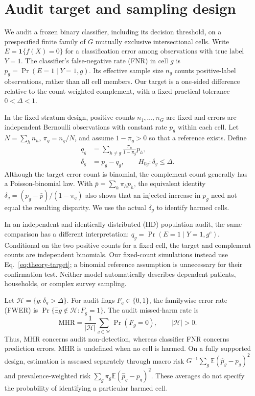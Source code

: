 \section{Audit target and sampling design}\label{sec:audit-target}

We audit a frozen binary classifier, including its decision threshold, on a
prespecified finite family of $G$ mutually exclusive intersectional cells.
Write $E=\mathbf{1}\{f(X)=0\}$ for a classification error among observations
with true label $Y=1$. The classifier's false-negative rate (FNR) in cell $g$
is $p_g=\Pr(E=1\mid Y=1,g)$. Its effective sample size $n_g$ counts
positive-label observations, rather than all cell members. Our target is a
one-sided difference relative to the count-weighted complement, with a fixed
practical tolerance $0<\Delta<1$.

In the fixed-stratum design, positive counts $n_1,\ldots,n_G$ are fixed and
errors are independent Bernoulli observations with constant rate $p_g$
within each cell. Let $N=\sum_h n_h$, $\pi_g=n_g/N$, and assume
$1-\pi_g>0$ so that a reference exists. Define
\begin{equation}
 \begin{aligned}
 q_g&=\sum_{h\ne g}\frac{\pi_h}{1-\pi_g}p_h,\\
 \delta_g&=p_g-q_g,\qquad H_{0g}:\delta_g\le\Delta.
 \end{aligned}
 \label{eq:theory-target}
\end{equation}
Although the target error count is binomial, the complement count generally
has a Poisson-binomial law. With $\bar p=\sum_h\pi_hp_h$, the equivalent
identity $\delta_g=(p_g-\bar p)/(1-\pi_g)$ also shows that an injected
increase in $p_g$ need not equal the resulting disparity. We use the actual
$\delta_g$ to identify harmed cells.

In an independent and identically distributed (IID) population audit, the same
comparison has a different interpretation: $q_g=\Pr(E=1\mid Y=1,g^c)$. Conditional on the two positive
counts for a fixed cell, the target and complement counts are independent
binomials. Our fixed-count simulations instead use
Eq.~\eqref{eq:theory-target}; a binomial reference assumption is unnecessary
for their confirmation test. Neither model automatically describes
dependent patients, households, or complex survey sampling.

Let $\mathcal H=\{g:\delta_g>\Delta\}$. For audit flags $F_g\in\{0,1\}$,
the familywise error rate (FWER) is
$\Pr\{\exists g\notin\mathcal H:F_g=1\}$. The audit missed-harm rate is
\begin{equation}
 \mathrm{MHR}=\frac{1}{|\mathcal H|}
      \sum_{g\in\mathcal H}\Pr(F_g=0), \qquad |\mathcal H|>0.
 \label{eq:theory-mhr}
\end{equation}
Thus, MHR concerns audit non-detection, whereas classifier FNR concerns
prediction errors. MHR is undefined when no cell is harmed. On a fully
supported design, estimation is assessed separately through macro risk
$G^{-1}\sum_g\mathbb E(\widehat p_g-p_g)^2$ and prevalence-weighted risk
$\sum_g\pi_g\mathbb E(\widehat p_g-p_g)^2$. These averages do not specify
the probability of identifying a particular harmed cell.

